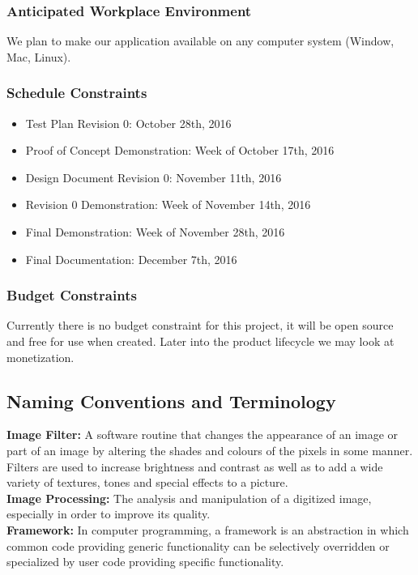 \documentclass[12pt, titlepage]{article}
\begin{document}
\subsubsection{Anticipated Workplace Environment}

We plan to make our application available on any computer system (Window, Mac, Linux).

\subsubsection{Schedule Constraints}

\begin{itemize}
  \item Test Plan Revision 0: October 28th, 2016
  \item Proof of Concept Demonstration: Week of October 17th, 2016
  \item Design Document Revision 0: November 11th, 2016
  \item Revision 0 Demonstration: Week of November 14th, 2016
  \item Final Demonstration: Week of November 28th, 2016
  \item Final Documentation: December 7th, 2016
\end{itemize}

\subsubsection{Budget Constraints}
Currently there is no budget constraint for this project, it will be open source and free for use when created. Later into the product lifecycle we may look at monetization.

\subsection{Naming Conventions and Terminology}

{\bf Image Filter:} A software routine that changes the appearance of an image or part of an image by altering the shades and colours of the pixels in some manner. Filters are used to increase brightness and contrast as well as to add a wide variety of textures, tones and special effects to a picture.\\

{\bf Image Processing:} The analysis and manipulation of a digitized image, especially in order to improve its quality.\\

{\bf Framework:} In computer programming, a framework is an abstraction in which common code providing generic functionality can be selectively overridden or specialized by user code providing specific functionality.
\end{document}
